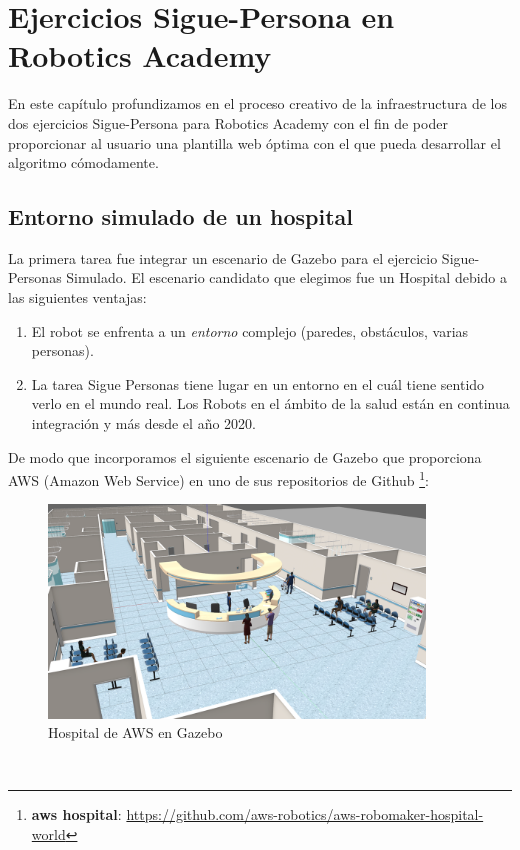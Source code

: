 \chapter{Ejercicios Sigue-Persona en Robotics Academy}
\label{cap:capitulo5}

En este capítulo profundizamos en el proceso creativo de la infraestructura de los dos ejercicios Sigue-Persona para Robotics Academy con el fin de poder proporcionar al usuario una plantilla web óptima con el que pueda desarrollar el algoritmo cómodamente.\\




\section{Entorno simulado de un hospital}
\label{sec:hospital_gazebo}

La primera tarea fue integrar un escenario de Gazebo para el ejercicio Sigue-Personas Simulado. El escenario candidato que elegimos fue un Hospital debido a las siguientes ventajas:

\begin{enumerate}
	\item El robot se enfrenta a un \textit{entorno} complejo (paredes, obstáculos, varias personas).
	\item La tarea Sigue Personas tiene lugar en un entorno en el cuál tiene sentido verlo en el mundo real. Los Robots en el ámbito de la salud están en continua integración y más desde el año 2020.
\end{enumerate}

De modo que incorporamos el siguiente escenario de Gazebo que proporciona AWS (Amazon Web Service) en uno de sus repositorios de Github \footnote{\textbf{aws hospital}: \url{https://github.com/aws-robotics/aws-robomaker-hospital-world}}:\\

\begin{figure} [H]
  \begin{center}
    \includegraphics[width=10cm]{imagenes/cap5/hospital_world.png}
  \end{center}
  \caption[Hospital de AWS en Gazebo]{Hospital de AWS en Gazebo}
  \label{fig:hospital_gazebo}
\end{figure}\

